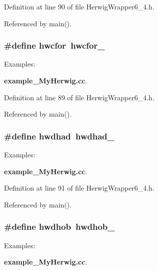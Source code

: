 Definition at line 90 of file Herwig\-Wrapper6\_\-4.h.

Referenced by main().
\subsubsection{\setlength{\rightskip}{0pt plus 5cm}\#define hwcfor~hwcfor\_\-}\label{HerwigWrapper6__4_8h_df39a02d8f66e5115b49ca74015710e8}


\begin{Desc}
\item[Examples: ]\par
{\bf example\_\-My\-Herwig.cc}.\end{Desc}


Definition at line 89 of file Herwig\-Wrapper6\_\-4.h.

Referenced by main().
\subsubsection{\setlength{\rightskip}{0pt plus 5cm}\#define hwdhad~hwdhad\_\-}\label{HerwigWrapper6__4_8h_629cd3557faf7c972f768860c0e784d5}


\begin{Desc}
\item[Examples: ]\par
{\bf example\_\-My\-Herwig.cc}.\end{Desc}


Definition at line 91 of file Herwig\-Wrapper6\_\-4.h.

Referenced by main().
\subsubsection{\setlength{\rightskip}{0pt plus 5cm}\#define hwdhob~hwdhob\_\-}\label{HerwigWrapper6__4_8h_9ede36f210233ee141da742bb95facd3}


\begin{Desc}
\item[Examples: ]\par
{\bf example\_\-My\-Herwig.cc}.\end{Desc}


